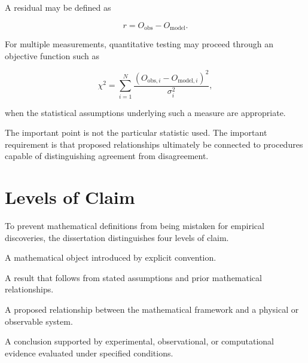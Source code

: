 \documentclass[12pt,oneside]{book}
\begin{document}
A residual may be defined as

\begin{equation}
    r
    =
    O_{\mathrm{obs}}
    -
    O_{\mathrm{model}}.
    \label{eq:model-residual}
\end{equation}

For multiple measurements, quantitative testing may proceed
through an objective function such as

\begin{equation}
    \chi^2
    =
    \sum_{i=1}^{N}
    \frac{
        \left(
            O_{\mathrm{obs},i}
            -
            O_{\mathrm{model},i}
        \right)^2
    }{
        \sigma_i^2
    },
    \label{eq:chi-square-intro}
\end{equation}

when the statistical assumptions underlying such a measure are
appropriate.

The important point is not the particular statistic used. The
important requirement is that proposed relationships ultimately
be connected to procedures capable of distinguishing agreement
from disagreement.


\section{Levels of Claim}
\label{sec:levels-of-claim}

To prevent mathematical definitions from being mistaken for
empirical discoveries, the dissertation distinguishes four
levels of claim.

\begin{description}[leftmargin=3.2cm, style=nextline]

    \item[Definition]
    A mathematical object introduced by explicit convention.

    \item[Derivation]
    A result that follows from stated assumptions and prior
    mathematical relationships.

    \item[Hypothesis]
    A proposed relationship between the mathematical framework
    and a physical or observable system.

    \item[Empirical Result]
    A conclusion supported by experimental, observational, or
    computational evidence evaluated under specified
    conditions.

\end{description}
\end{document}

